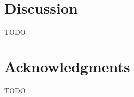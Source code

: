 \documentclass[fleqn,moreauthors,10pt]{ds_report}
\begin{document}

\section*{Discussion}

TODO



\section*{Acknowledgments}

TODO




\end{document}
